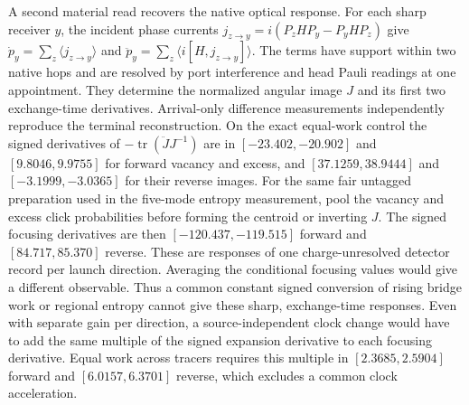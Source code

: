 A second material read recovers the native optical response. For
each sharp receiver $y$, the incident phase currents
$j_{z\to y}=i(P_z H P_y-P_y H P_z)$ give
$\dot p_y=\sum_z\langle j_{z\to y}\rangle$ and
$\ddot p_y=\sum_z\langle i[H,j_{z\to y}]\rangle$.
The terms have support within two native hops and are resolved by
port interference and head Pauli readings at one appointment.
They determine the normalized angular image $J$ and its first two
exchange-time derivatives. Arrival-only difference measurements
independently reproduce the terminal reconstruction. On the exact
equal-work control the signed derivatives of
$-\operatorname{tr}(\ddot J J^{-1})$ are in $[-23.402,-20.902]$
and $[9.8046,9.9755]$ for forward vacancy and excess, and
$[37.1259,38.9444]$ and $[-3.1999,-3.0365]$ for their reverse images.
For the same fair untagged preparation used in the five-mode entropy
measurement, pool the vacancy and excess click probabilities before
forming the centroid or inverting $J$. The signed focusing derivatives
are then $[-120.437,-119.515]$ forward and $[84.717,85.370]$ reverse.
These are responses of one charge-unresolved detector record per launch
direction. Averaging the conditional focusing values would give a
different observable.
Thus a common constant signed conversion of rising bridge work or
regional entropy cannot give these sharp, exchange-time responses.
Even with separate gain per direction, a source-independent clock
change would have to add the same multiple of the signed expansion
derivative to each focusing derivative. Equal work across tracers
requires this multiple in $[2.3685,2.5904]$ forward and
$[6.0157,6.3701]$ reverse, which excludes a common clock acceleration.


